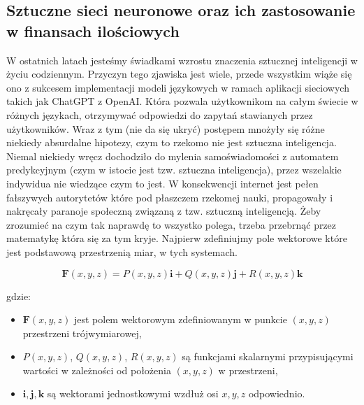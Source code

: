 \begin{enumerate}
\section{Sztuczne sieci neuronowe oraz ich zastosowanie w finansach ilościowych}

W ostatnich latach jesteśmy świadkami wzrostu znaczenia sztucznej inteligencji w życiu codziennym. Przyczyn tego zjawiska jest wiele, przede wszystkim wiąże się ono z sukcesem implementacji modeli językowych w ramach aplikacji sieciowych takich jak ChatGPT z OpenAI. Która pozwala użytkownikom na całym świecie w różnych językach, otrzymywać odpowiedzi do zapytań stawianych przez użytkowników. Wraz z tym (nie da się ukryć) postępem mnożyły się różne niekiedy absurdalne hipotezy, czym to rzekomo nie jest sztuczna inteligencja. Niemal niekiedy wręcz dochodziło do mylenia samoświadomości z automatem predykcyjnym (czym w istocie jest tzw. sztuczna inteligencja), przez wszelakie indywidua nie wiedzące czym to jest. W konsekwencji internet jest pełen fałszywych autorytetów które pod płaszczem rzekomej nauki, propagowały i nakręcały paranoje społeczną związaną z tzw. sztuczną inteligencją. 
Żeby zrozumieć na czym tak naprawdę to wszystko polega, trzeba przebrnąć przez matematykę która się za tym kryje. Najpierw zdefiniujmy pole wektorowe które jest podstawową przestrzenią miar, w tych systemach. 

\begin{equation}
\mathbf{F}(x, y, z) = P(x, y, z) \mathbf{i} + Q(x, y, z) \mathbf{j} + R(x, y, z) \mathbf{k}
\end{equation}

gdzie:
\begin{itemize}
    \item $\mathbf{F}(x, y, z)$ jest polem wektorowym zdefiniowanym w punkcie $(x, y, z)$ przestrzeni trójwymiarowej,
    \item $P(x, y, z)$, $Q(x, y, z)$, $R(x, y, z)$ są funkcjami skalarnymi przypisującymi wartości w zależności od położenia $(x, y, z)$ w przestrzeni,
    \item $\mathbf{i}, \mathbf{j}, \mathbf{k}$ są wektorami jednostkowymi wzdłuż osi $x, y, z$ odpowiednio.
\end{itemize}


\end{enumerate}
